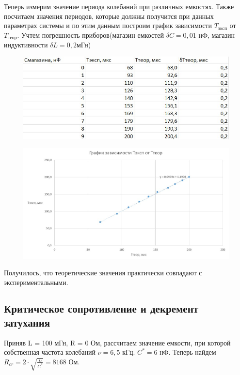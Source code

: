 \documentclass[a4paper,12pt]{article}
\begin{document}
Теперь измерим значение периода колебаний при различных емкостях. Также посчитаем значения периодов, которые должны получится при данных параметрах системы и по этим данным построим график зависимости $T_{\text{эксп}}$ от $T_{\text{теор}}$. Учтем погрешность приборов(магазин емкостей $\delta C = 0,01$ нФ, магазин индуктивности $\delta L = 0,2 $мГн)

\begin{figure}[H]
	\begin{center}
    		\includegraphics[width=.5\textwidth]{tabliza2.2.jpg}
    	\end{center}
\end{figure}

\begin{figure}[H]
	\begin{center}    		
    		\includegraphics[width=1\textwidth]{graphik2.2.jpg}
    	\end{center}
\end{figure}
Получилось, что теоретические значения практически совпадают с экспериментальными.

\subsection*{Критическое сопротивление и декремент затухания}
Приняв L = 100 мГн, R = 0 Ом, рассчитаем значение емкости, при которой собственная частота колебаний $\nu = 6,5$ кГц. $C^\ast = 6 $ нФ. Теперь найдем $R_{cr} = 2 \cdot \sqrt{\frac{L}{C^\ast}} = 8168$ Ом.
\end{document}
